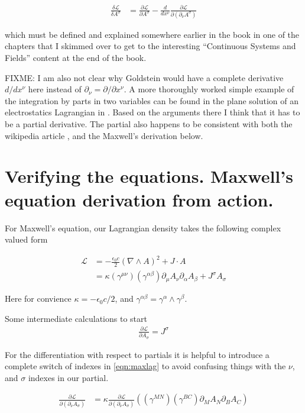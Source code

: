 \documentclass{article}
\newcommand{\LL}[0]{\mathcal{L}}
\newcommand{\PD}[2]{\frac{\partial {#2}}{\partial {#1}}}
\newcommand{\grad}[0]{\nabla}
\begin{document}
\begin{align*}
\frac{\delta \LL}{\delta A^\sigma} &= \PD{A^\sigma}{\LL} - \frac{d}{dx^\nu} \PD{(\partial_\nu A^\sigma)}{\LL}
\end{align*}

which must be defined and explained somewhere earlier in the book in one of the chapters that I skimmed over to get to the interesting ``Continuous Systems and Fields'' content
at the end of the book.

FIXME: I am also not clear why Goldstein would have a complete derivative $d/dx^\nu$ here instead of $\partial_\nu = \partial/{\partial x^\nu}$.  A more thoroughly worked simple example
of the integration by parts in two variables can be found in the plane solution of an electrostatics Lagrangian in \cite{PJMaxwellLagrangian}.  Based on the arguments there I think that it has to be a partial derivative.   The partial also happens to be consistent with both the wikipedia article \cite{wikiemtensor}, and the Maxwell's derivation below.

\section{ Verifying the equations.  Maxwell's equation derivation from action. }

For Maxwell's equation, our Lagrangian density takes the following complex valued form

\begin{align}\label{eqn:maxlag}
\LL
&= -\frac{\epsilon_0 c}{2} (\grad \wedge A)^2 + J \cdot A \\
&= \kappa (\gamma^{\mu\nu}) (\gamma^{\alpha\beta}) \partial_\mu A_\nu \partial_\alpha A_\beta + J^\sigma A_\sigma
\end{align}

Here for convience $\kappa = -\epsilon_0 c /2$, and $\gamma^{\alpha\beta} = \gamma^\alpha \wedge \gamma^\beta$.

Some intermediate calculations to start
\begin{align*}
\PD{A_\sigma}{\LL} = J^\sigma
\end{align*}

For the differentiation with respect to partials it is helpful to introduce a complete switch of indexes in \ref{eqn:maxlag}
to avoid confusing things with the $\nu$, and $\sigma$ indexes in our partial.

\begin{align*}
\PD{(\partial_\nu A_\sigma)}{\LL} 
&= \kappa \PD{(\partial_\nu A_\sigma)}{\LL} \left( (\gamma^{M N}) (\gamma^{B C}) \partial_M A_N \partial_B A_C \right) \\
\end{align*}
\end{document}
